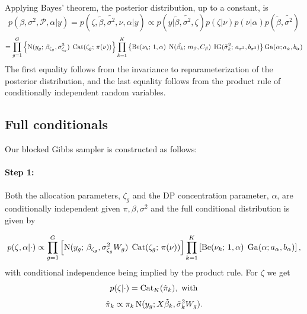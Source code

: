 Applying Bayes' theorem, the posterior distribution, up to a constant, is
\begin{equation*}
p(\beta,\sigma^2,\mathcal{P},\alpha|y) = p(\zeta, \tilde{\beta},\tilde{\sigma^2},\nu,\alpha | y) \propto p(y|\tilde{\beta},\tilde{\sigma^2},\zeta) p(\zeta|\nu) p(\nu|\alpha)p(\tilde{\beta},\tilde{\sigma^2})
\end{equation*}
\begin{equation*}
= \prod_{g=1}^G \left\{ \operatorname{N}(y_g;\,\beta_{\zeta_g},\sigma^2_{\zeta_g})\; \operatorname{Cat}(\zeta_g;\, \pi(\nu)) \right\} \prod_{k=1}^K \left\{ \operatorname{Be}(\nu_k;\, 1, \alpha)\; \operatorname{N}(\tilde{\beta_k};\,m_\beta, C_\beta)\;\operatorname{IG}(\tilde{\sigma}^2_k;\,a_{\sigma^2},b_{\sigma^2})\right\} \operatorname{Ga}(\alpha;a_\alpha,b_\alpha)
\end{equation*}
The first equality follows from the  invariance to reparameterization of the posterior distribution, and the last equality follows from the product rule of conditionally independent random variables.

\subsection{Full conditionals}
\label{subsec:full-cond}
Our blocked Gibbs sampler is constructed as follows:
\paragraph{Step 1:}
Both the allocation parameters, $\zeta_g$ and the DP concentration parameter, $\alpha$, are conditionally independent given $\pi, \beta, \sigma^2$ and the full conditional distribution is given by

\begin{equation}
p(\zeta, \alpha|\cdot) \propto \prod_{g=1}^G \left[ \operatorname{N}(y_g;\,\beta_{\zeta_g},\sigma^2_{\zeta_g}W_g)\; \operatorname{Cat}(\zeta_g;\, \pi(\nu)) \right] \prod_{k=1}^K \left[ \operatorname{Be}(\nu_k;\, 1, \alpha)\; \operatorname{Ga}(\alpha;a_\alpha,b_\alpha)\right],
\end{equation}
with conditional independence being implied by the product rule. For $\zeta$ we get
\begin{equation}
\label{zetafull}
p(\zeta|\cdot) = \operatorname{Cat}_K(\hat{\pi}_k), \mbox{ with}
\end{equation}
\begin{equation*}
\hat{\pi}_k \propto \pi_k \operatorname{N}(y_g;X\tilde{\beta}_k,\tilde{\sigma}_k^2 W_g).
\end{equation*}

